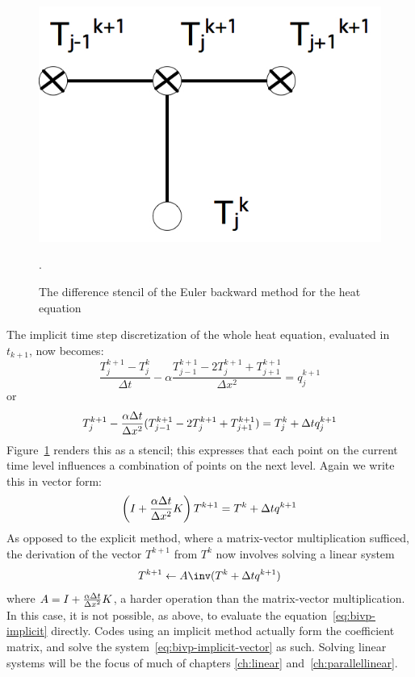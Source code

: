 \begin{figure}
  \leavevmode\kern\unitindent 
  \includegraphics[scale=.20]{graphics/euler-backward}
  \caption{The difference stencil of the Euler backward method for the
    heat equation}
  \label{fig:Euler-backward-stencil}.
\end{figure}
%
The implicit time step discretization of the whole heat equation,
evaluated in~$t_{k+1}$, now becomes:
\[
  \frac{T_j^{k+1}-T_j^k}{\Delta t}-\alpha
  \frac{T_{j-1}^{k+1}-2T_j^{k+1}+T_{j+1}^{k+1}}{\Delta x^2}=q_j^{k+1} 
\]
or
\begin{equation}
  \label{eq:bivp-implicit}
  T_j^{k+1}-\frac{\alpha\Delta t}{\Delta x^2}
  (T_{j-1}^{k+1}-2T_j^{k+1}+T_{j+1}^{k+1})=T_j^k+\Delta t q_j^{k+1}
\end{equation}
Figure~\ref{fig:Euler-backward-stencil} renders this as a stencil;
this expresses that each point on the current time level influences a
combination of points on the next level.
Again we write this in vector form:
\begin{equation}
  \label{eq:bivp-implicit-vector}
  \left(I+\frac{\alpha\Delta t}{\Delta x^2} K\right) T^{k+1}=
   T^k+\Delta t q^{k+1}
\end{equation}
As opposed to the explicit method, where a matrix-vector
multiplication sufficed, the derivation of the vector $ T^{k+1}$ 
from $ T^k$ now involves solving a linear system
\[ T^{k+1}\leftarrow A\inv (T^k+\Delta tq^{k+1}) \]
where $A=I+\frac{\alpha\Delta t}{\Delta x^2} K$, a harder operation than the matrix-vector
multiplication.  In this case, it is not possible, as above, to
evaluate the equation~\eqref{eq:bivp-implicit} directly. Codes using an
implicit method actually form the coefficient matrix, and solve the
system~\eqref{eq:bivp-implicit-vector} as such. Solving linear systems
will be the focus of much of chapters \ref{ch:linear}
and~\ref{ch:parallellinear}.

